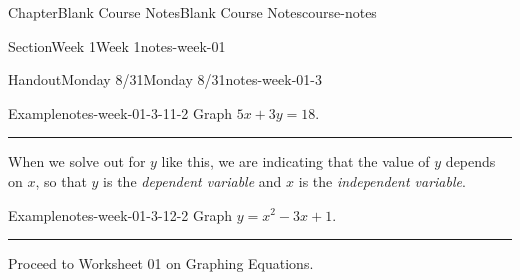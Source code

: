 \documentclass[twoside,14pt,]{extbook}
\newlength{\ptxworkspacestrutwidth}
\begin{document}
\begin{chapterptx}{Chapter}{Blank Course Notes}{}{Blank Course Notes}{}{}{course-notes}
\begin{sectionptx}{Section}{Week 1}{}{Week 1}{}{}{notes-week-01}
\begin{handout-subsection}{Handout}{Monday 8\slash{}31}{}{Monday 8\slash{}31}{}{}{notes-week-01-3}
\begin{example}{Example}{}{notes-week-01-3-11-2}%
Graph \(5x + 3y = 18\).%
\par\rule{\ptxworkspacestrutwidth}{3in}%
\end{example}
\clearpage
When we solve out for \(y\) like this, we are indicating that the value of \(y\) depends on \(x\), so that \(y\) is the \emph{dependent variable} and \(x\) is the \emph{independent variable}.%
\begin{example}{Example}{}{notes-week-01-3-12-2}%
Graph \(y=x^2  - 3x + 1\).%
\par\rule{\ptxworkspacestrutwidth}{3in}%
\end{example}
Proceed to Worksheet 01 on Graphing Equations.%
\end{handout-subsection}
\restoregeometry
\end{sectionptx}
\end{chapterptx}
%
%
\typeout{************************************************}
\typeout{************************************************}
%
\end{document}
